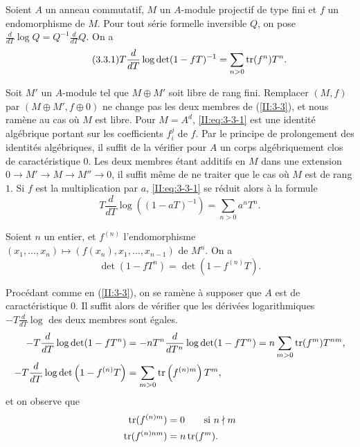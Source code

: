 \begin{proposition_}\label{II:3-3}
Soient $A$ un anneau commutatif, $M$ un $A$-module projectif de type fini et 
$f$ un endomorphisme de $M$. Pour tout série formelle inversible $Q$, on pose 
$\frac{d}{dT}\log Q = Q^{-1}\frac{d}{dT}Q$. On a 
\begin{equation*}\tag{3.3.1}\label{II:eq:3-3-1}
  T\frac{d}{dT}\log\det(1-f T)^{-1} = \sum_{n>0} \operatorname{tr}(f^n) T^n \text{.}
\end{equation*}
\end{proposition_}

Soit $M'$ un $A$-module tel que $M\oplus M'$ soit libre de rang fini. 
Remplacer $(M,f)$ par $(M\oplus M',f\oplus 0)$ ne change pas les deux membres 
de (\ref{II:3-3}), et nous ramène au cas où $M$ est libre. Pour $M=A^d$, 
\eqref{II:eq:3-3-1} est une identité algébrique portant sur les coefficients 
$f_i^j$ de $f$. Par le principe de prolongement des identités algébriques, 
il suffit de la vérifier pour $A$ un corps algébriquement clos de 
caractéristique $0$. Les deux membres étant additifs en $M$ dans une 
extension $0\to M'\to M\to M''\to 0$, il suffit même de ne traiter que le cas 
où $M$ est de rang $1$. Si $f$ est la multiplication par $a$, 
\eqref{II:eq:3-3-1} se réduit alors à la formule 
\[
  T\frac{d}{dT}\log\left((1-a T)^{-1}\right) = \sum_{n>0} a^n T^n \text{.}
\]





\begin{corollary_}\label{II:3-4}
Soient $n$ un entier, et $f^{(n)}$ l'endomorphisme 
$(x_1,\dotsc,x_n)\mapsto \left(f(x_n),x_1,\dotsc,x_{n-1}\right)$ de $M^n$. 
On a 
\begin{equation*}\tag{3.4.1}\label{II:eq:3-4-1}
  \det(1-f T^n) = \det(1-f^{(n)} T) \text{.}
\end{equation*}
\end{corollary_}

Procédant comme en (\ref{II:3-3}), on se ramène à supposer que $A$ est de 
caractéristique $0$. Il suffit alors de vérifier que les dérivées 
logarithmiques $-T\frac{d}{dT}\log$ des deux membres sont égales. 
\begin{align*}
  -T\frac{d}{dT}\log\det(1-f T^n) &= - n T^n \frac{d}{dT^n} \log\det(1-f T^n) = n \sum_{m>0} \operatorname{tr}(f^m) T^{n m} \text{,} \\
  -T \frac{d}{dT}\log\det\left(1-f^{(n)} T\right) &= \sum_{m>0} \operatorname{tr}\left(f^{(n) m}\right) T^m \text{,}
\end{align*}
et on observe que 
\begin{align*}
  \operatorname{tr}(f^{(n) m}) &= 0 \qquad \text{si $n\nmid m$} \\
  \operatorname{tr}(f^{(n) n m}) &= n \operatorname{tr}(f^m) \text{.}
\end{align*}





